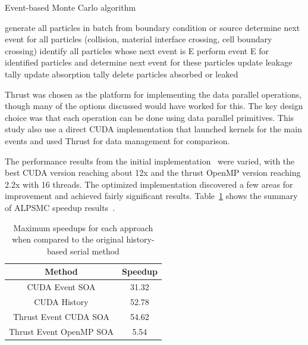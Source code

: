 \begin{algorithm}
\DontPrintSemicolon
\caption{Event-based Monte Carlo algorithm}
\label{alg:eventbased}
{ 
    generate all particles in batch from boundary condition or source\;
    determine next event for all particles (collision, material interface crossing, cell boundary crossing)\;
    {
       {
          identify all particles whose next event is E\;
          perform event E for identified particles and determine next event for these particles\;
       }
       {
          update leakage tally\;
       }
       {
          update absorption tally\;
       }
       delete particles absorbed or leaked\;
    }
}
\end{algorithm}

Thrust was chosen as the platform for implementing the data parallel operations, though many of the options discussed would have worked for this.
%
The key design choice was that each operation can be done using data parallel primitives.
%
This study also use a direct CUDA implementation that launched kernels for the main events and used Thrust for data management for comparison.

The performance results from the initial implementation~\cite{alpsmc1} were varied, with the best CUDA version reaching about 12x and the thrust OpenMP version reaching 2.2x with 16 threads.
%
The optimized implementation discovered a few areas for improvement and achieved fairly significant results.
%
Table~\ref{tab:ALPSspeedup} shows the summary of ALPSMC speedup results~\cite{alpsmc2}.
%

\begin{table}
\caption { Maximum speedups for each approach when compared to the original history-based serial method } \label{tab:ALPSspeedup} 
\begin{center}
\begin{tabular}{ |c|c|}
\hline
Method & Speedup\\
\hline
CUDA Event SOA & 31.32\\
\hline
CUDA History & 52.78\\
\hline
Thrust Event CUDA SOA & 54.62\\
\hline
Thrust Event OpenMP SOA & 5.54\\
\hline
\end{tabular}
\end{center}
\end{table}

